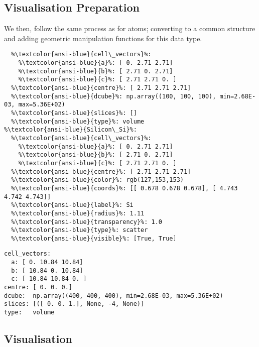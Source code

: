 \documentclass[10pt,parskip=half,
	toc=sectionentrywithdots,
	bibliography=totocnumbered,
	captions=tableheading,numbers=noendperiod]{scrartcl}
\begin{document}
\subsection{Visualisation Preparation}\label{visualisation-preparation}

We then, follow the same process as for atoms; converting to a common
structure and adding geometric manipulation functions for this data
type.

\begin{lstlisting}[language={},postbreak={},numbers=none,xrightmargin=7pt,belowskip=5pt,aboveskip=5pt,breakindent=0pt,escapechar=\%]
%\textcolor{ansi-blue}{Silicon Charge}%: 
  %\textcolor{ansi-blue}{cell\_vectors}%: 
    %\textcolor{ansi-blue}{a}%: [ 0. 2.71 2.71]
    %\textcolor{ansi-blue}{b}%: [ 2.71 0. 2.71]
    %\textcolor{ansi-blue}{c}%: [ 2.71 2.71 0. ]
  %\textcolor{ansi-blue}{centre}%: [ 2.71 2.71 2.71]
  %\textcolor{ansi-blue}{dcube}%: np.array((100, 100, 100), min=2.68E-03, max=5.36E+02)
  %\textcolor{ansi-blue}{slices}%: []
  %\textcolor{ansi-blue}{type}%: volume
%\textcolor{ansi-blue}{Silicon\_Si}%: 
  %\textcolor{ansi-blue}{cell\_vectors}%: 
    %\textcolor{ansi-blue}{a}%: [ 0. 2.71 2.71]
    %\textcolor{ansi-blue}{b}%: [ 2.71 0. 2.71]
    %\textcolor{ansi-blue}{c}%: [ 2.71 2.71 0. ]
  %\textcolor{ansi-blue}{centre}%: [ 2.71 2.71 2.71]
  %\textcolor{ansi-blue}{color}%: rgb(127,153,153)
  %\textcolor{ansi-blue}{coords}%: [[ 0.678 0.678 0.678], [ 4.743 4.742 4.743]]
  %\textcolor{ansi-blue}{label}%: Si
  %\textcolor{ansi-blue}{radius}%: 1.11
  %\textcolor{ansi-blue}{transparency}%: 1.0
  %\textcolor{ansi-blue}{type}%: scatter
  %\textcolor{ansi-blue}{visible}%: [True, True]

\end{lstlisting}

\begin{lstlisting}[language={},postbreak={},numbers=none,xrightmargin=7pt,belowskip=5pt,aboveskip=5pt,breakindent=0pt]
cell_vectors: 
  a: [ 0. 10.84 10.84]
  b: [ 10.84 0. 10.84]
  c: [ 10.84 10.84 0. ]
centre: [ 0. 0. 0.]
dcube:  np.array((400, 400, 400), min=2.68E-03, max=5.36E+02)
slices: [([ 0. 0. 1.], None, -4, None)]
type:   volume

\end{lstlisting}

\subsection{Visualisation}\label{visualisation}
\end{document}
